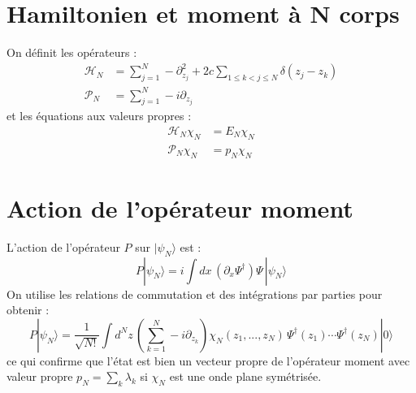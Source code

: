 \section{Hamiltonien et moment à N corps}
On définit les opérateurs :
\begin{align}
\mathcal{H}_N &= \sum_{j=1}^N -\partial_{z_j}^2 + 2c \sum_{1 \leq k < j \leq N} \delta(z_j - z_k) \\
\mathcal{P}_N &= \sum_{j=1}^N -i \partial_{z_j}
\end{align}
et les équations aux valeurs propres :
\begin{align}
\mathcal{H}_N \chi_N &= E_N \chi_N \\
\mathcal{P}_N \chi_N &= p_N \chi_N
\end{align}

\section{Action de l’opérateur moment}
L’action de l’opérateur $P$ sur $|\psi_N\rangle$ est :
\[
P |\psi_N\rangle = i \int dx\, (\partial_x \Psi^\dagger) \Psi\, |\psi_N\rangle
\]
On utilise les relations de commutation et des intégrations par parties pour obtenir :
\[
P |\psi_N\rangle = \frac{1}{\sqrt{N!}} \int d^N z\, \left( \sum_{k=1}^N -i \partial_{z_k} \right) \chi_N(z_1,...,z_N)\, \Psi^\dagger(z_1)\cdots \Psi^\dagger(z_N)|0\rangle
\]
ce qui confirme que l’état est bien un vecteur propre de l’opérateur moment avec valeur propre $p_N = \sum_k \lambda_k$ si $\chi_N$ est une onde plane symétrisée.


